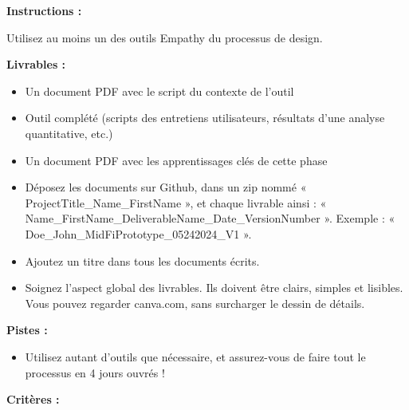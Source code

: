 \makeheaderfiles

\textbf{Instructions :}

Utilisez au moins un des outils Empathy du processus de design.

\textbf{Livrables :}

\begin{itemize}
\item Un document PDF avec le script du contexte de l'outil
\item Outil complété (scripts des entretiens utilisateurs, résultats d'une analyse quantitative, etc.)
\item Un document PDF avec les apprentissages clés de cette phase
\item Déposez les documents sur Github, dans un zip nommé « ProjectTitle\_Name\_FirstName », et chaque livrable ainsi : « Name\_FirstName\_DeliverableName\_Date\_VersionNumber ». Exemple : « Doe\_John\_MidFiPrototype\_05242024\_V1 ».
\item Ajoutez un titre dans tous les documents écrits.
\item Soignez l'aspect global des livrables. Ils doivent être clairs, simples et lisibles. Vous pouvez regarder canva.com, sans surcharger le dessin de détails.
\end{itemize}

\textbf{Pistes :}

\begin{itemize}
\item Utilisez autant d'outils que nécessaire, et assurez-vous de faire tout le processus en 4 jours ouvrés !
\end{itemize}

\textbf{Critères :}

